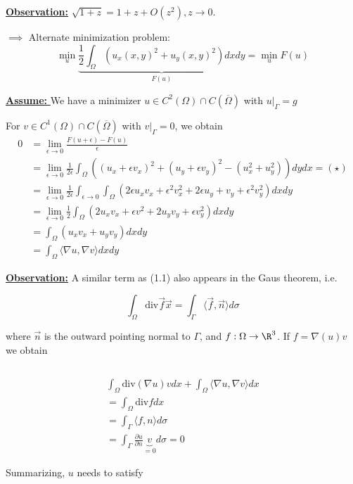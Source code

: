 \underline{\textbf{Observation:}} $\sqrt{1+z}=1+z+O(z^2),z\to 0$.

$\implies $ Alternate minimization problem: 
\[\min_{u} \underbrace{\frac{1}{2}\int_\Omega \left(u_x(x,y)^2+u_y(x,y)^2 \right) dx dy}_{F(u)}=\min_u F(u)\]


\underline{\textbf{Assume: }} We have a minimizer $u\in C^2(\Omega)\cap C(\overline{\Omega})$ with $u\vert_{\Gamma}=g$ %

For $v\in C^1(\Omega)\cap C(\overline{\Omega})$ with $v\vert_\Gamma=0$, we obtain 
\begin{align}
    0&=\lim_{\epsilon\to 0}\frac{F(u+\epsilon)-F(u)}{\epsilon}\\
    &=\lim_{\epsilon\to 0} \frac{1}{2\epsilon}\int_\Omega\left((u_x+\epsilon v_x)^2+ (u_y+ \epsilon v_y)^2- (u_x^2+u_y^2) \right)dydx = (\star)\\
    &= \lim_{\epsilon\to 0} \frac{1}{2 \epsilon}\int_{\epsilon\to 0}\int_\Omega (2 \epsilon u_x v_x+\epsilon^2 v_x^2+2 \epsilon u_y+v_y+ \epsilon^2v_y^2)dxdy\\
    &=\lim_{\epsilon\to 0}\frac{1}{2}\int_\Omega(2u_xv_x+\epsilon v^2+ 2u_yv_y+\epsilon v_y^2)dxdy\\
    &=\int_\Omega(u_xv_x+u_yv_y)dxdy\\
    &=\int_\Omega \langle  \nabla u, \nabla v \rangle dxdy%
\end{align} 

\underline{\textbf{Observation:}} A similar term as (1.1) also appears in the Gaus theorem, i.e.

\[\int_\Omega\text{div} \overrightarrow{f}\overrightarrow{x}=\int_\Gamma \langle \overrightarrow{f},\overrightarrow{n} \rangle d\sigma \]

where $\overrightarrow{n}$ is the outward pointing normal to $\Gamma$, and $f:\Omega\to\R^3$. If $f=\nabla(u)v$ we obtain

\[\]


\begin{align*}
    \int_\Omega \text{div}(\nabla u)v dx+ \int_\Omega \langle \nabla u,\nabla v \rangle dx\\
    =\int_\Omega \text{div} f dx\\
    =\int_\Gamma \langle f, n\rangle d\sigma\\
    =\int_\Gamma\frac{\partial u}{\partial n} \underbrace{v}_{=0} d\sigma =0
\end{align*}

Summarizing, $u$ needs to satisfy 

